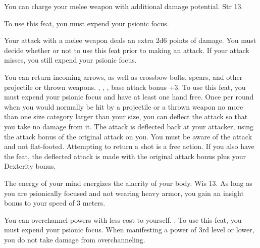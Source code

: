 {You can charge your melee weapon with additional damage potential.}
{Str 13.}
{To use this feat, you must expend your psionic focus.

Your attack with a melee weapon deals an extra 2d6 points of damage. You must decide whether or not to use this feat prior to making an attack. If your attack misses, you still expend your psionic focus.}
{}{}


{You can return incoming arrows, as well as crossbow bolts, spears, and other projectile or thrown weapons.}
{, , , base attack bonus +3.}
{To use this feat, you must expend your psionic focus and have at least one hand free. Once per round when you would normally be hit by a projectile or a thrown weapon no more than one size category larger than your size, you can deflect the attack so that you take no damage from it. The attack is deflected back at your attacker, using the attack bonus of the original attack on you. You must be aware of the attack and not flat-footed. Attempting to return a shot is a free action.}
{}
{If you also have the  feat, the deflected attack is made with the original attack bonus plus your Dexterity bonus.}


{The energy of your mind energizes the alacrity of your body.}
{Wis 13.}
{As long as you are psionically focused and not wearing heavy armor, you gain an insight bonus to your speed of 3 meters.}
{}{}

{You can overchannel powers with less cost to yourself.}
{.}
{To use this feat, you must expend your psionic focus. When manifesting a power of 3rd level or lower, you do not take damage from overchanneling.}
{}{}

